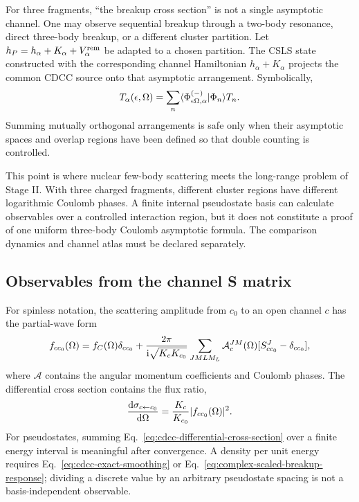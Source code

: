 For three fragments, ``the breakup cross section'' is not a single asymptotic
channel.  One may observe sequential breakup through a two-body resonance,
direct three-body breakup, or a different cluster partition.  Let
$h_P=h_\alpha+K_\alpha+V_\alpha^{\mathrm{rem}}$ be adapted to a chosen partition.
The CSLS state constructed with the corresponding channel Hamiltonian
$h_\alpha+K_\alpha$ projects the common CDCC source onto that asymptotic
arrangement.  Symbolically,
\begin{equation}
  T_\alpha(\epsilon,\Omega)
  =\sum_n
  \langle \Phi_{\epsilon\Omega,\alpha}^{(-)}|\Phi_n \rangle T_n.
  \label{eq:arrangement-resolved-amplitude}
\end{equation}
Summing mutually orthogonal arrangements is safe only when their asymptotic
spaces and overlap regions have been defined so that double counting is
controlled.

This point is where nuclear few-body scattering meets the long-range problem
of Stage II.  With three charged fragments, different cluster regions have
different logarithmic Coulomb phases.  A finite internal pseudostate basis can
calculate observables over a controlled interaction region, but it does not
constitute a proof of one uniform three-body Coulomb asymptotic formula.  The
comparison dynamics and channel atlas must be declared separately.

\subsection{Observables from the channel S matrix}
\label{subsec:cdcc-observables}

For spinless notation, the scattering amplitude from $c_0$ to an open channel
$c$ has the partial-wave form
\begin{equation}
  f_{cc_0}(\Omega)
  =f_C(\Omega)\delta_{cc_0}
  +\frac{2\pi}{\mathrm{i}\sqrt{K_cK_{c_0}}}
   \sum_{JMLM_L}
   \mathcal A_{c}^{JM}(\Omega)
   [S^J_{cc_0}-\delta_{cc_0}],
  \label{eq:cdcc-scattering-amplitude}
\end{equation}
where $\mathcal A$ contains the angular momentum coefficients and Coulomb
phases.  The differential cross section contains the flux ratio,
\begin{equation}
  \frac{\mathrm{d}\sigma_{c\leftarrow c_0}}{\mathrm{d}\Omega}
  =\frac{K_c}{K_{c_0}}|f_{cc_0}(\Omega)|^2.
  \label{eq:cdcc-differential-cross-section}
\end{equation}
For pseudostates, summing Eq.~\eqref{eq:cdcc-differential-cross-section} over a
finite energy interval is meaningful after convergence.  A density per unit
energy requires Eq.~\eqref{eq:cdcc-exact-smoothing} or
Eq.~\eqref{eq:complex-scaled-breakup-response}; dividing a discrete value by
an arbitrary pseudostate spacing is not a basis-independent observable.

